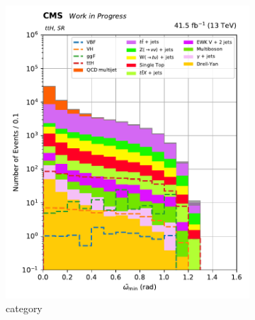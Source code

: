 \begin{figure}[htbp]
    \centering
    \begin{subfigure}[b]{0.27\textwidth}
        \includegraphics[width=\textwidth]{figures/category_optimisations/min_omega_tilde_ttH.pdf}
        \caption{\ttH category}
    \end{subfigure}
    \hfill
    \begin{subfigure}[b]{0.27\textwidth}

\end{subfigure}
\end{figure}

